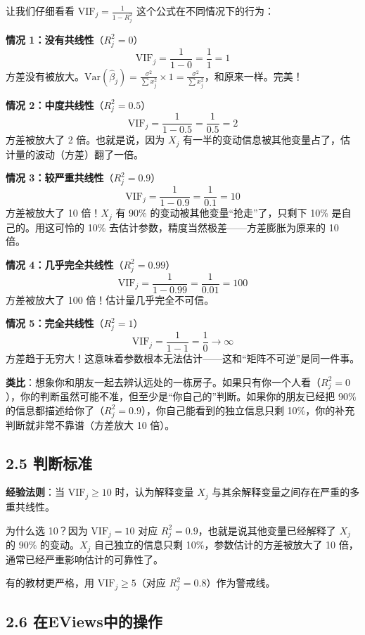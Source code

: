 \documentclass[12pt,a4paper]{ctexart}
\begin{document}
让我们仔细看看 $\text{VIF}_j = \frac{1}{1 - R_j^2}$ 这个公式在不同情况下的行为：

\textbf{情况 1：没有共线性}（$R_j^2 = 0$）
\[
\text{VIF}_j = \frac{1}{1 - 0} = \frac{1}{1} = 1
\]
方差没有被放大。$\text{Var}(\hat{\beta}_j) = \frac{\sigma^2}{\sum x_j^2} \times 1 = \frac{\sigma^2}{\sum x_j^2}$，和原来一样。完美！

\textbf{情况 2：中度共线性}（$R_j^2 = 0.5$）
\[
\text{VIF}_j = \frac{1}{1 - 0.5} = \frac{1}{0.5} = 2
\]
方差被放大了 2 倍。也就是说，因为 $X_j$ 有一半的变动信息被其他变量占了，估计量的波动（方差）翻了一倍。

\textbf{情况 3：较严重共线性}（$R_j^2 = 0.9$）
\[
\text{VIF}_j = \frac{1}{1 - 0.9} = \frac{1}{0.1} = 10
\]
方差被放大了 10 倍！$X_j$ 有 90\% 的变动被其他变量“抢走”了，只剩下 10\% 是自己的。用这可怜的 10\% 去估计参数，精度当然极差——方差膨胀为原来的 10 倍。

\textbf{情况 4：几乎完全共线性}（$R_j^2 = 0.99$）
\[
\text{VIF}_j = \frac{1}{1 - 0.99} = \frac{1}{0.01} = 100
\]
方差被放大了 100 倍！估计量几乎完全不可信。

\textbf{情况 5：完全共线性}（$R_j^2 = 1$）
\[
\text{VIF}_j = \frac{1}{1 - 1} = \frac{1}{0} \to \infty
\]
方差趋于无穷大！这意味着参数根本无法估计——这和“矩阵不可逆”是同一件事。

\textbf{类比}：想象你和朋友一起去辨认远处的一栋房子。如果只有你一个人看（$R_j^2 = 0$），你的判断虽然可能不准，但至少是“你自己的”判断。如果你的朋友已经把 90\% 的信息都描述给你了（$R_j^2 = 0.9$），你自己能看到的独立信息只剩 10\%，你的补充判断就非常不靠谱（方差放大 10 倍）。

\subsection*{2.5 判断标准}

\textbf{经验法则}：当 $\text{VIF}_j \geq 10$ 时，认为解释变量 $X_j$ 与其余解释变量之间存在严重的多重共线性。

为什么选 10？因为 $\text{VIF}_j = 10$ 对应 $R_j^2 = 0.9$，也就是说其他变量已经解释了 $X_j$ 的 90\% 的变动。$X_j$ 自己独立的信息只剩 10\%，参数估计的方差被放大了 10 倍，通常已经严重影响估计的可靠性了。

有的教材更严格，用 $\text{VIF}_j \geq 5$（对应 $R_j^2 = 0.8$）作为警戒线。

\subsection*{2.6 在EViews中的操作}
\end{document}
